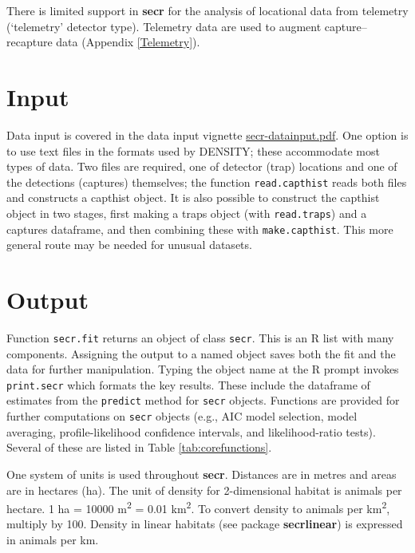 \documentclass[
]{book}
\begin{document}
There is limited support in \textbf{secr} for the analysis of locational data from telemetry (`telemetry' detector type). Telemetry data are used to augment capture--recapture data (Appendix \ref{Telemetry}).

\section{Input}\label{input}

Data input is covered in the data input vignette \href{https://www.otago.ac.nz/density/pdfs/secr-datainput.pdf}{secr-datainput.pdf}. One option is to use text files in the formats used by DENSITY; these accommodate most types of data. Two files are required, one of detector (trap) locations and one of the detections (captures) themselves; the function \texttt{read.capthist} reads both files and constructs a capthist object. It is also possible to construct the capthist object in two stages, first making a traps object (with \texttt{read.traps}) and a captures dataframe, and then combining these with \texttt{make.capthist}. This more general route may be needed for unusual datasets.

\section{Output}\label{output-1}

Function \texttt{secr.fit} returns an object of class \texttt{secr}. This is an R list with many components. Assigning the output to a named object saves both the fit and the data for further manipulation. Typing the object name at the R prompt invokes \texttt{print.secr} which formats the key results. These include the dataframe of estimates from the \texttt{predict} method for \texttt{secr} objects. Functions are provided for further computations on \texttt{secr} objects (e.g., AIC model selection, model averaging, profile-likelihood confidence intervals, and likelihood-ratio tests). Several of these are listed in Table \ref{tab:corefunctions}.


One system of units is used throughout \textbf{secr}. Distances are in metres and areas are in hectares (ha). The unit of density for 2-dimensional habitat is animals per hectare. 1 ha = 10000 m\textsuperscript{2} = 0.01 km\textsuperscript{2}. To convert density to animals per km\textsuperscript{2}, multiply by 100. Density in linear habitats (see package \textbf{secrlinear}) is expressed in animals per km.
\end{document}
